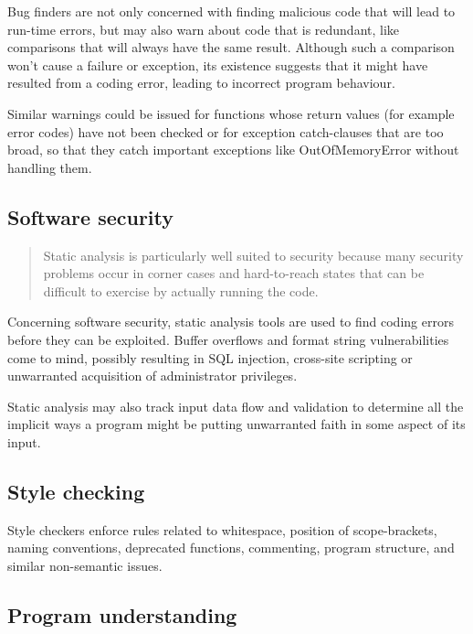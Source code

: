 Bug finders are not only concerned with finding malicious code that will lead to run-time errors, but may also warn about code that is redundant, like comparisons that will always have the same result. Although such a comparison won't cause a failure or exception, its existence suggests that it might have resulted from a coding error, leading to incorrect program behaviour.

Similar warnings could be issued for functions whose return values (for example error codes) have not been checked or for exception catch-clauses that are too broad, so that they catch important exceptions like OutOfMemoryError without handling them.

\subsection{Software security}

\begin{quotation}
Static analysis is particularly well suited to security because many security problems occur in corner cases and hard-to-reach states that can be difficult to exercise by actually running the code.
\end{quotation}

Concerning software security, static analysis tools are used to find coding errors before they can be exploited. Buffer overflows and format string vulnerabilities come to mind, possibly resulting in SQL injection, cross-site scripting or unwarranted acquisition of administrator privileges. 

Static analysis may also track input data flow and validation to determine
all the implicit ways a program might be putting unwarranted faith in some aspect of its input.

\subsection{Style checking}

Style checkers enforce rules related to whitespace, position of scope-brackets, naming conventions, deprecated functions, commenting, program structure, and similar non-semantic issues. 


\subsection{Program understanding}

